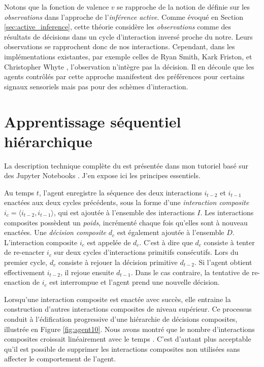 Notons que la fonction de valence $v$ se rapproche de la notion de  définie sur les \emph{observations} dans l'approche de l'\emph{inférence active}. 
Comme évoqué en Section \ref{sec:active_inference}, cette théorie considère les \emph{observations} comme des résultats de décisions dans un cycle d'interaction inversé proche du notre. 
Leurs observations se rapprochent donc de nos interactions. 
Cependant, dans les implémentations existantes, par exemple celles de  Ryan Smith, Kark Friston, et Christopher Whyte  \cite{smith_step-by-step_2022}, l'observation n'intègre pas la décision. %
Il en découle que les agents contrôlés par cette approche manifestent des préférences pour certains signaux sensoriels mais pas pour des schèmes d'interaction.



\section{Apprentissage séquentiel hiérarchique}

\noindent
La description technique complète du  est présentée dans mon tutoriel basé sur des Jupyter Notebooks \cite{georgeon_schema_2025-1}. 
J'en expose ici les principes essentiels.

Au temps $t$, l'agent enregistre la séquence des deux interactions $i_{t-2}$ et $i_{t-1}$ enactées aux deux cycles précédents, sous la forme d'une \emph{interaction composite} $i_c = \langle i_{t-2}, i_{t-1} \rangle$, qui est ajoutée à l'ensemble des interactions $I$. 
Les interactions composites possèdent un \emph{poids}, incrémenté chaque fois qu'elles sont à nouveau enactées.
Une \emph{décision composite} $d_c$ est également ajoutée à l'ensemble $D$. 
L'interaction composite $i_c$ est appelée  de $d_c$.
C'est à dire que $d_c$ consiste à tenter de re-enacter $i_c$ sur deux cycles d'interactions primitifs consécutifs.
Lors du premier cycle, $d_c$ consiste à rejouer la décision primitive $d_{t-2}$. 
Si l'agent obtient effectivement $i_{t-2}$, il rejoue ensuite $d_{t-1}$.
Dans le cas contraire, la tentative de re-enaction de $i_c$ est interrompue et l'agent prend une nouvelle décision.

Lorsqu'une interaction composite est enactée avec succès, elle entraine la construction d'autres interactions composites de niveau supérieur. 
Ce processus conduit à l'édification progressive d'une hiérarchie de décisions composites, illustrée en Figure \ref{fig:agent10}. 
Nous avons montré que le nombre d'interactions composites croissait linéairement avec le temps \cite{georgeon_schema_2025-1}.
C'est  d'autant plus acceptable qu'il est possible de supprimer les interactions composites non utilisées sans affecter le comportement de l'agent.


